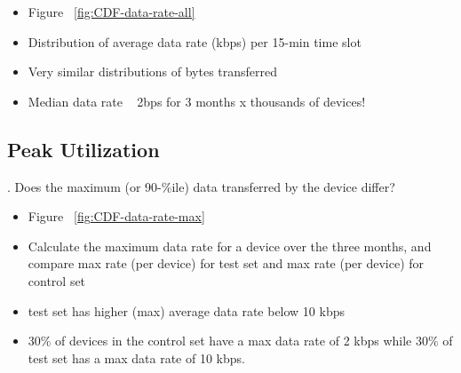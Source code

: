 \begin{itemize}
\itemsep0em 
\item Figure ~\ref{fig:CDF-data-rate-all}
\item Distribution of average data rate (kbps) per 15-min time slot 
\item Very similar distributions of bytes transferred
\item Median data rate ~ 2bps for 3 months x thousands of devices!
\end{itemize}



\subsection{Peak Utilization}
\label{subsec:peak-util}

. Does the maximum (or 90-\%ile) data transferred by the device differ?

\begin{itemize}
\itemsep0em 
\item Figure ~\ref{fig:CDF-data-rate-max}
\item Calculate the maximum data rate for a device over the three months, and compare max rate (per device) for test set and max rate (per device) for control set
\item test set has higher (max) average data rate below 10 kbps 
\item 30\% of devices in the control set have a max data rate of 2 kbps while 30\% of test set has a max data rate of 10 kbps.
\end{itemize}

